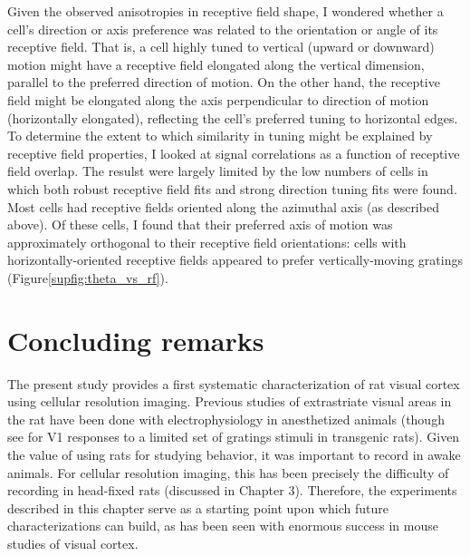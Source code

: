 Given the observed anisotropies in receptive field shape, I wondered whether a cell's direction or axis preference was related to the orientation or angle of its receptive field. That is, a cell highly tuned to vertical (upward or downward) motion might have a receptive field elongated along the vertical dimension, parallel to the preferred direction of motion. On the other hand, the receptive field might be elongated along the axis perpendicular to direction of motion (horizontally elongated), reflecting the cell's preferred tuning to horizontal edges. To determine the extent to which similarity in tuning might be explained by receptive field properties, I looked at signal correlations as a function of receptive field overlap. The resulst were largely limited by the low numbers of cells in which both robust receptive field fits and strong direction tuning fits were found. Most cells had receptive fields oriented along the azimuthal axis (as described above). Of these cells, I found that their preferred axis of motion was approximately orthogonal to their receptive field orientations:  cells with horizontally-oriented receptive fields appeared to prefer  vertically-moving gratings (Figure\ref{supfig:theta_vs_rf}). 


\section{Concluding remarks}
The present study provides a first systematic characterization of rat visual cortex using cellular resolution imaging. Previous studies of extrastriate visual areas in the rat have been done with electrophysiology in anesthetized animals\cite{Girman1999a, Vermaercke2014, Tafazoli2017} (though see \citet{Scott2018} for V1 responses to a limited set of gratings stimuli in transgenic rats). Given the value of using rats for studying behavior, it was important to record in awake animals. For cellular resolution imaging, this has been precisely the difficulty of recording in head-fixed rats (discussed in Chapter 3). Therefore, the experiments described in this chapter serve as a starting point upon which future characterizations can build, as has been seen with enormous success in mouse studies of visual cortex.

